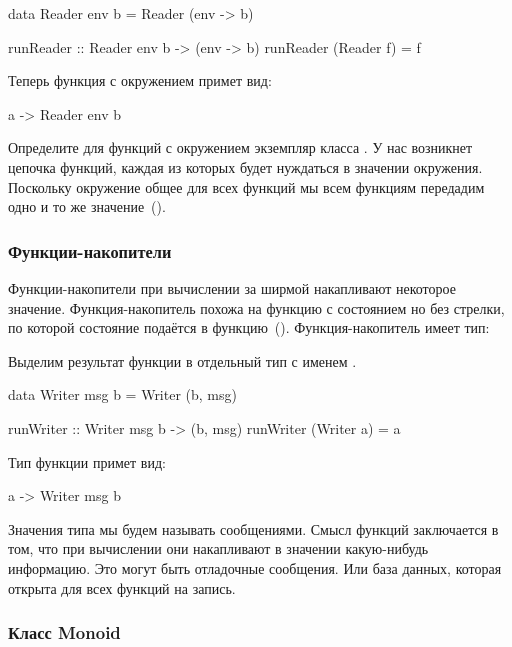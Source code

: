 \begin{code}
data Reader env b = Reader (env -> b)

runReader :: Reader env b -> (env -> b)
runReader (Reader f) = f
\end{code}

Теперь функция с окружением примет вид:


\begin{code}
a -> Reader env b
\end{code}

Определите для функций с окружением экземпляр класса . У нас
возникнет цепочка функций, каждая из которых будет нуждаться в значении
окружения. Поскольку окружение общее для всех функций мы всем функциям
передадим одно и то же значение~().


\subsubsection{Функции-накопители}

 Функции-накопители при вычислении за
ширмой накапливают некоторое значение. Функция-накопитель похожа на
функцию с состоянием но без стрелки, по которой состояние подаётся в
функцию~(). Функция-накопитель имеет тип:


Выделим результат функции в отдельный тип с именем .


\begin{code}
data Writer msg b = Writer (b, msg)

runWriter :: Writer msg b -> (b, msg)
runWriter (Writer a) = a
\end{code}

Тип функции примет вид:


\begin{code}
a -> Writer msg b
\end{code}

Значения типа  мы будем называть сообщениями. Смысл функций
 заключается в том, что при вычислении они
накапливают в значении  какую-нибудь информацию. Это могут быть
отладочные сообщения. Или база данных, которая открыта для всех функций
на запись.

\subsubsection{Класс Monoid}

